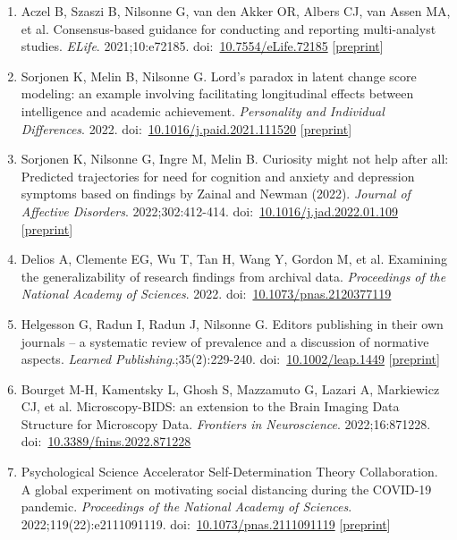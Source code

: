 \documentclass[10pt,a4paper,twocolumn]{article}
\begin{document}
\begin{enumerate}
    \item Aczel B, Szaszi B, Nilsonne G, van den Akker OR, Albers CJ, van Assen MA, et al. Consensus-based guidance for conducting and reporting multi-analyst studies. \textit{ELife}. 2021;10:e72185. doi:~\href{https://doi.org/10.7554/eLife.72185}{10.7554/eLife.72185} [\href{https://doi.org/10.31222/osf.io/5ecnh}{preprint}]

    \item Sorjonen K, Melin B, Nilsonne G. Lord’s paradox in latent change score modeling: an example involving facilitating longitudinal effects between intelligence and academic achievement. \textit{Personality and Individual Differences}. 2022. doi:~\href{https://doi.org/10.1016/j.paid.2021.111520}{10.1016/j.paid.2021.111520} [\href{https://doi.org/10.31234/osf.io/q8bpa}{preprint}]

    \item Sorjonen K, Nilsonne G, Ingre M, Melin B. Curiosity might not help after all: Predicted trajectories for need for cognition and anxiety and depression symptoms based on findings by Zainal and Newman (2022). \textit{Journal of Affective Disorders}. 2022;302:412-414. doi:~\href{https://doi.org/10.1016/j.jad.2022.01.109}{10.1016/j.jad.2022.01.109} [\href{https://doi.org/10.31234/osf.io/dh2zm}{preprint}]

    \item Delios A, Clemente EG, Wu T, Tan H, Wang Y, Gordon M, et al. Examining the generalizability of research findings from archival data. \textit{Proceedings of the National Academy of Sciences}. 2022. doi:~\href{https://doi.org/10.1073/pnas.2120377119}{10.1073/pnas.2120377119}

    \item Helgesson G, Radun I, Radun J, Nilsonne G. Editors publishing in their own journals – a systematic review of prevalence and a discussion of normative aspects. \textit{Learned Publishing}.;35(2):229-240. doi:~\href{https://doi.org/10.1002/leap.1449}{10.1002/leap.1449} [\href{https://doi.org/10.31222/osf.io/dc6je}{preprint}]

    \item Bourget M-H, Kamentsky L, Ghosh S, Mazzamuto G, Lazari A, Markiewicz CJ, et al. Microscopy-BIDS: an extension to the Brain Imaging Data Structure for Microscopy Data. \textit{Frontiers in Neuroscience}. 2022;16:871228. doi:~\href{https://doi.org/10.3389/fnins.2022.871228}{10.3389/fnins.2022.871228}

    \item Psychological Science Accelerator Self-Determination Theory Collaboration. A global experiment on motivating social distancing during the COVID-19 pandemic. \textit{Proceedings of the National Academy of Sciences}. 2022;119(22):e2111091119. doi:~\href{https://doi.org/10.1073/pnas.2111091119}{10.1073/pnas.2111091119} [\href{https://doi.org/10.31234/osf.io/n3dyf}{preprint}]


\end{enumerate}
\end{document}
